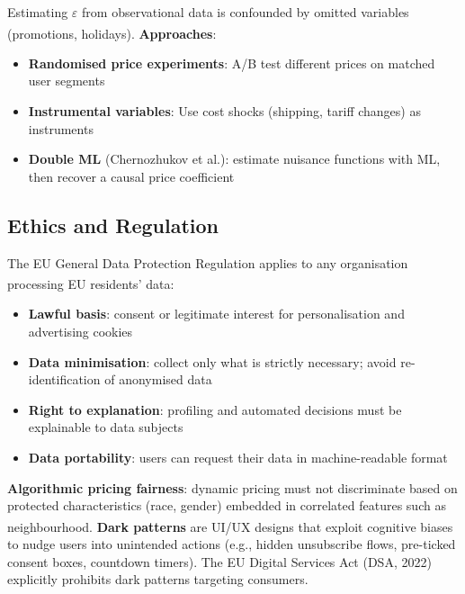 \begin{tcbitemize}[ skin=sectionraster ]
    \tcbitem[title=Demand Elasticity Measurement, raster multicolumn=3]
    Estimating $\varepsilon$ from observational data is confounded by omitted variables (promotions, holidays)\textsuperscript{\cite[][p.~4]{wickDemandForecastingIndividual2021}}.
    \textbf{Approaches}:
    \begin{itemize}
        \item \textbf{Randomised price experiments}: A/B test different prices on matched user segments
        \item \textbf{Instrumental variables}: Use cost shocks (shipping, tariff changes) as instruments
        \item \textbf{Double ML} (Chernozhukov et al.): estimate nuisance functions with ML, then recover a causal price coefficient
    \end{itemize}

\end{tcbitemize}

\subsection{Ethics and Regulation}

\begin{tcbitemize}[ skin=sectionraster ]

    \tcbitem[title=GDPR in E-Commerce, raster multicolumn=3]
    The EU General Data Protection Regulation applies to any organisation processing EU residents' data\textsuperscript{\cite[][pp.~25--35]{itgovernanceprivacyteamEUGDPR2020}}:
    \begin{itemize}
        \item \textbf{Lawful basis}: consent or legitimate interest for personalisation and advertising cookies
        \item \textbf{Data minimisation}: collect only what is strictly necessary; avoid re-identification of anonymised data
        \item \textbf{Right to explanation}: profiling and automated decisions must be explainable to data subjects
        \item \textbf{Data portability}: users can request their data in machine-readable format
    \end{itemize}

    \tcbitem[title={Algorithmic Fairness and Dark Patterns}, raster multicolumn=3]
    \textbf{Algorithmic pricing fairness}: dynamic pricing must not discriminate based on protected characteristics (race, gender) embedded in correlated features such as neighbourhood\textsuperscript{\cite[][pp.~80--85]{laudonECommerce2020}}.
    \textbf{Dark patterns} are UI/UX designs that exploit cognitive biases to nudge users into unintended actions (e.g., hidden unsubscribe flows, pre-ticked consent boxes, countdown timers).
    The EU Digital Services Act (DSA, 2022) explicitly prohibits dark patterns targeting consumers.

\end{tcbitemize}

